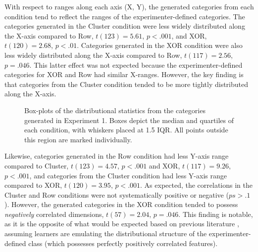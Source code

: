 \documentclass[12pt]{article}
\newcommand\inputpgf[2]{{
\let\pgfimageWithoutPath\pgfimage
\renewcommand{\pgfimage}[2][]{\pgfimageWithoutPath[##1]{#1/##2}}

}}
\begin{document}
\begin{flushleft}
With respect to ranges along each axis (X, Y), the generated categories from
each condition tend to reflect the ranges of the experimenter-defined
categories. The categories generated in the Cluster condition were less widely
distributed along the X-axis compared to Row, $t(123) = 5.61$, $p < .001$, and
XOR, $t(120) = 2.68$, $p < .01$. Categories generated in the XOR condition
were also less widely distributed along the X-axis compared to Row, $t(117) =
2.56$, $p = .046$. This latter effect was not expected because the
experimenter-defined categories for XOR and Row had similar X-ranges. However,
the key finding is that categories from the Cluster condition tended to be more
tightly distributed along the X-axis.

\begin{figure}
    \begin{center} \inputpgf{figs/}{e1-statsboxes.pgf}
    \caption{Box-plots of the distributional statistics from the categories
generated in Experiment 1. Boxes depict the median and quartiles of each
condition, with whiskers placed at 1.5 IQR. All points outside this region are
marked individually.}
    \label{fig:e1-statsboxes}
    \end{center}
\end{figure}


Likewise, categories generated in the Row condition had less Y-axis range
compared to Cluster, $t(123) = 4.57$, $p < .001$ and XOR, $t(117) = 9.26$, $p <
.001$, and categories from the Cluster condition had less Y-axis range compared
to XOR, $t(120) = 3.95$, $p < .001$. As expected, the correlations in the
Cluster and Row conditions were not systematically positive or negative ($ps >
.1$). However, the generated categories in the XOR condition tended to possess
{\em negatively} correlated dimensions, $t(57) = 2.04$, $p = .046$. This
finding is notable, as it is the opposite of what would be expected based on previous literature \citep{jern2013probabilistic}, assuming
learners are emulating the distributional structure of the experimenter-defined
class (which possesses perfectly positively correlated features).


\end{flushleft}
\end{document}
